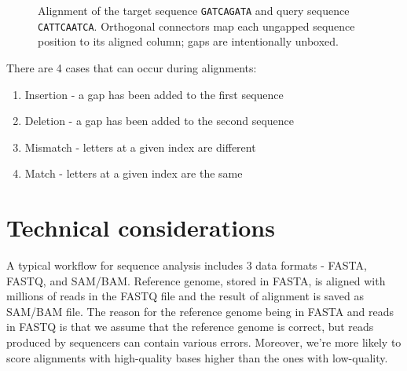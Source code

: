 \begin{figure}[H]
\caption{Alignment of the target sequence \texttt{GATCAGATA} and query
sequence \texttt{CATTCAATCA}. Orthogonal connectors map each ungapped
sequence position to its aligned column; gaps are intentionally unboxed.}
\label{fig:biology-alignment-example}
\end{figure}

\noindent There are 4 cases that can occur during alignments:
\begin{enumerate}
\item Insertion - a gap has been added to the first sequence
\item Deletion - a gap has been added to the second sequence
\item Mismatch - letters at a given index are different
\item Match - letters at a given index are the same
\end{enumerate}


\section{Technical considerations}

A typical workflow for sequence analysis includes $3$ data formats - FASTA, FASTQ, and SAM/BAM. Reference genome, stored in FASTA, is aligned with millions of reads in the FASTQ file and the result of alignment is saved as SAM/BAM file. The reason for the reference genome being in FASTA and reads in FASTQ is that we assume that the reference genome is correct, but reads produced by sequencers can contain various errors. Moreover, we're more likely to score alignments with high-quality bases higher than the ones with low-quality.

